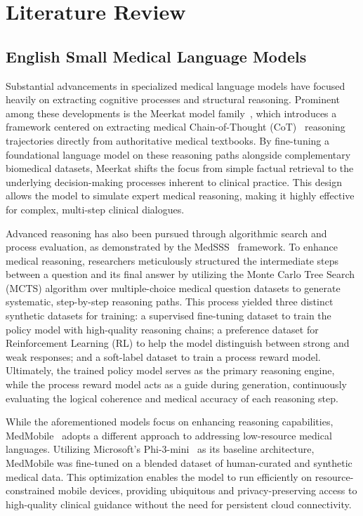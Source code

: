 \documentclass[review]{elsarticle}
\begin{document}
\section{Literature Review}

\subsection{English Small Medical Language Models}

Substantial advancements in specialized medical language models have focused heavily on extracting cognitive processes and structural reasoning. Prominent among these developments is the Meerkat model family~\cite{b6}, which introduces a framework centered on extracting medical Chain-of-Thought (CoT)~\cite{b7} reasoning trajectories directly from authoritative medical textbooks. By fine-tuning a foundational language model on these reasoning paths alongside complementary biomedical datasets, Meerkat shifts the focus from simple factual retrieval to the underlying decision-making processes inherent to clinical practice. This design allows the model to simulate expert medical reasoning, making it highly effective for complex, multi-step clinical dialogues.

Advanced reasoning has also been pursued through algorithmic search and process evaluation, as demonstrated by the MedSSS~\cite{b8} framework. To enhance medical reasoning, researchers meticulously structured the intermediate steps between a question and its final answer by utilizing the Monte Carlo Tree Search (MCTS) algorithm over multiple-choice medical question datasets to generate systematic, step-by-step reasoning paths. This process yielded three distinct synthetic datasets for training: a supervised fine-tuning dataset to train the policy model with high-quality reasoning chains; a preference dataset for Reinforcement Learning (RL) to help the model distinguish between strong and weak responses; and a soft-label dataset to train a process reward model. Ultimately, the trained policy model serves as the primary reasoning engine, while the process reward model acts as a guide during generation, continuously evaluating the logical coherence and medical accuracy of each reasoning step.

While the aforementioned models focus on enhancing reasoning capabilities, MedMobile~\cite{b9} adopts a different approach to addressing low-resource medical languages. Utilizing Microsoft’s Phi-3-mini~\cite{b10} as its baseline architecture, MedMobile was fine-tuned on a blended dataset of human-curated and synthetic medical data. This optimization enables the model to run efficiently on resource-constrained mobile devices, providing ubiquitous and privacy-preserving access to high-quality clinical guidance without the need for persistent cloud connectivity.
\end{document}
